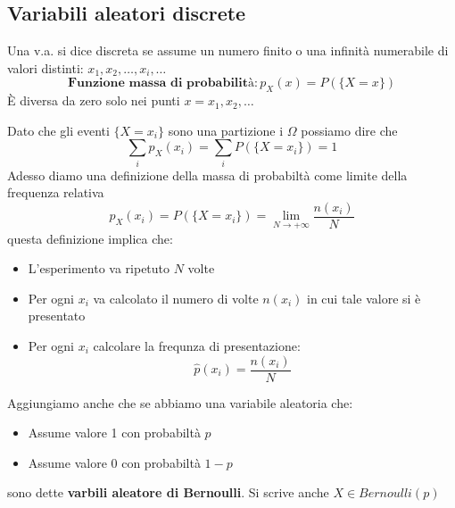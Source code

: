 \subsection{Variabili aleatori discrete}\label{sub:Variabili aleatori discrete} %
\begin{importantbox}
    Una v.a. si dice discreta se assume un numero finito
    o una infinità numerabile di valori distinti: $x_1, x_2, \dots ,x_i, \dots$ 
    \[
        \textbf{Funzione massa di probabilità}: p_X(x) = P(\{X = x\}) 
    \]
    È diversa da zero solo nei punti $x = x_1, x_2, \dots$
\end{importantbox}
Dato che gli eventi $\{X = x_i\}$ sono una partizione i $\Omega$ possiamo dire che 
\[
    \sum_i p_X(x_i) = \sum_i P(\{X = x_i\}) = 1
\]
Adesso diamo una definizione della massa di probabiltà come limite della frequenza
relativa
\[
    p_X(x_i) = P(\{X = x_i\}) = \lim_{N \to +\infty} \frac{n(x_i)}{N}
\]
questa definizione implica che:
\begin{itemize}
    \item L'esperimento va ripetuto $N$ volte
    \item Per ogni $x_i$ va  calcolato il numero di volte $n(x_i)$ in cui tale valore si è presentato
    \item Per ogni $x_i$ calcolare la frequnza di presentazione:
        \[
            \hat p(x_i) = \frac{n(x_i)}{N}
        \]
\end{itemize}
Aggiungiamo anche che se abbiamo una variabile aleatoria che:
\begin{itemize}
    \item Assume valore 1 con probabiltà $p$
    \item Assume valore 0 con probabiltà $1 - p$
\end{itemize}
sono dette \textbf{varbili aleatore di Bernoulli}. Si scrive anche $X \in \textit{Bernoulli}(p)$
